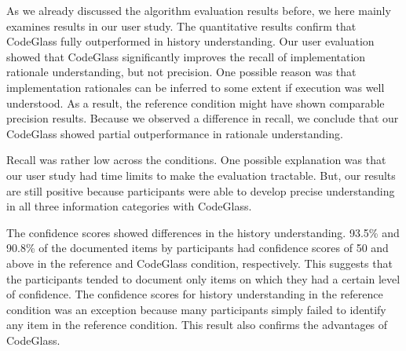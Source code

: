 As we already discussed the algorithm evaluation results before, we here mainly examines results in our user study.
The quantitative results confirm that CodeGlass fully outperformed in history understanding.
Our user evaluation showed that CodeGlass significantly improves the recall of implementation rationale understanding, but not precision.
One possible reason was that implementation rationales can be inferred to some extent if execution was well understood.
As a result, the reference condition might have shown comparable precision results.
Because we observed a difference in recall, we conclude that our CodeGlass showed partial outperformance in rationale understanding.

Recall was rather low across the conditions.
One possible explanation was that our user study had time limits to make the evaluation tractable.
But, our results are still positive because participants were able to develop precise understanding in all three information categories with CodeGlass.

The confidence scores showed differences in the history understanding.
93.5\% and 90.8\% of the documented items by participants had confidence scores of 50 and above in the reference and CodeGlass condition, respectively.
This suggests that the participants tended to document only items on which they had a certain level of confidence.
The confidence scores for history understanding in the reference condition was an exception because many participants simply failed to identify any item in the reference condition.
This result also confirms the advantages of CodeGlass.
